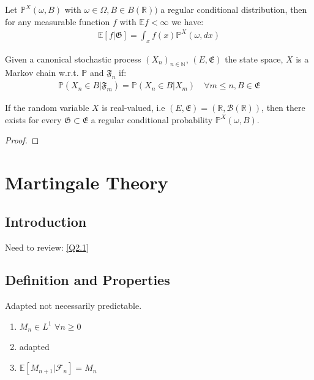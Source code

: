 \begin{theorem}
	Let $\mathbb{P}^X(\omega, B)$ with $\omega \in \Omega, B \in B(\mathbb{R}))$ a regular conditional distribution, then for any measurable function $f$ with $\mathbb{E}f < \infty$ we have:
	\begin{align*}
		\mathbb{E}[f|\mathfrak{G}] = \int_x f(x) \mathbb{P}^X(\omega, dx)
	\end{align*}
\end{theorem}

 \begin{example}
 Given a canonical stochastic process $(X_n)_{n \in \mathbb{N}}$, $(E, \mathfrak{E})$ the state space, $X$ is a Markov chain w.r.t. $\mathbb{P}$ and $\mathfrak{F}_n$ if:
 \begin{align*}
 	\mathbb{P}(X_n\in B | \mathfrak{F}_m) = \mathbb{P}(X_n \in B|X_{m}) \quad \forall m \le n, B \in \mathfrak{E}
 \end{align*}
 \end{example}

\begin{theorem}
	If the random variable $X$ is real-valued, i.e $(E, \mathfrak{E}) = ( \mathbb{R}, \mathcal{B}(\mathbb{R}))$, then there exists for every 
	$\mathfrak{G} \subset \mathfrak{E}$ a regular conditional probability $\mathbb{P}^X(\omega, B)$.
\end{theorem}
\begin{proof}
\end{proof}

\begin{example}

\end{example}


\newpage
\section{Martingale Theory}
\subsection{Introduction}
Need to review: \ref{Q2.1} 	
\subsection{Definition and Properties}
\begin{definition}[Martingale]
Adapted not necessarily predictable.
\begin{enumerate}
	\item $M_n \in L^1$ $\forall n \geq 0$
	\item adapted
	\item $\mathbb{E}[M_{n+1}|\mathcal{F}_{n}] = M_n$
\end{enumerate}
\end{definition}

